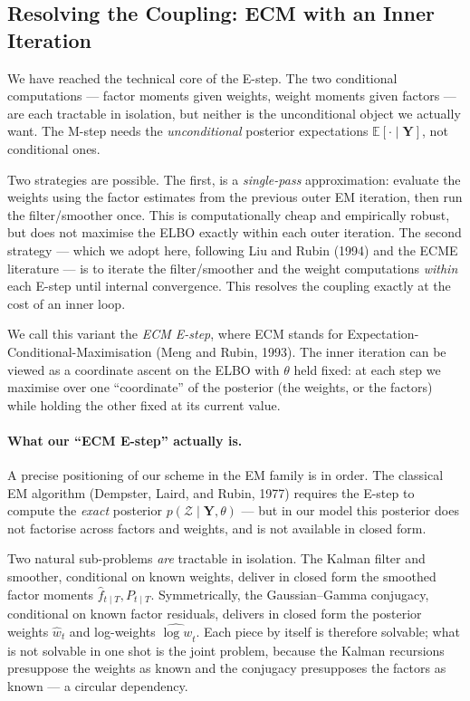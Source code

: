 \documentclass[11pt, a4paper, oneside]{article}
\newcommand{\mY}{\mathbf{Y}}
\begin{document}
\newpage 
\subsection{Resolving the Coupling: ECM with an Inner Iteration}
\label{subsec:coupling}

We have reached the technical core of the E-step. The two conditional
computations — factor moments given weights, weight moments given
factors — are each tractable in isolation, but neither is the
unconditional object we actually want. The M-step needs the
\emph{unconditional} posterior expectations
$\mathbb{E}[\cdot \mid \mY]$, not conditional ones.

Two strategies are possible. The first, is a
\emph{single-pass} approximation: evaluate the weights using the
factor estimates from the previous outer EM iteration, then run the
filter/smoother once. This is computationally cheap and empirically
robust, but does not maximise the ELBO exactly within each outer
iteration. The second strategy — which we adopt here, following Liu
and Rubin (1994) and the ECME literature — is to iterate the
filter/smoother and the weight computations \emph{within} each E-step
until internal convergence. This resolves the coupling exactly at the
cost of an inner loop.

We call this variant the \emph{ECM E-step}, where ECM stands for
Expectation-Conditional-Maximisation (Meng and Rubin, 1993). The inner
iteration can be viewed as a coordinate ascent on the ELBO with $\theta$
held fixed: at each step we maximise over one ``coordinate'' of the
posterior (the weights, or the factors) while holding the other fixed
at its current value.

\paragraph{What our ``ECM E-step'' actually is.}
A precise positioning of our scheme in the EM family is in order. The
classical EM algorithm (Dempster, Laird, and Rubin, 1977) requires
the E-step to compute the \emph{exact} posterior
$p(\mathcal{Z} \mid \mY, \theta)$ — but in our model this posterior
does not factorise across factors and weights, and is not available
in closed form.

Two natural sub-problems \emph{are} tractable in isolation. The
Kalman filter and smoother, conditional on known weights, deliver in
closed form the smoothed factor moments $\hat{f}_{t \mid T}, P_{t \mid T}$.
Symmetrically, the Gaussian--Gamma conjugacy, conditional on known
factor residuals, delivers in closed form the posterior weights
$\hat{w}_t$ and log-weights $\widehat{\log w}_t$. Each piece by itself
is therefore solvable; what is not solvable in one shot is the joint
problem, because the Kalman recursions presuppose the weights as
known and the conjugacy presupposes the factors as known — a
circular dependency.
\end{document}
